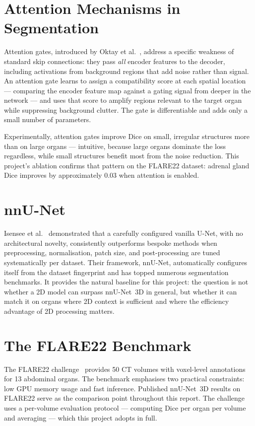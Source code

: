 \section{Attention Mechanisms in Segmentation}

Attention gates, introduced by Oktay et al.~\cite{oktay2018}, address a specific weakness of standard skip connections: they pass \emph{all} encoder features to the decoder, including activations from background regions that add noise rather than signal. An attention gate learns to assign a compatibility score at each spatial location --- comparing the encoder feature map against a gating signal from deeper in the network --- and uses that score to amplify regions relevant to the target organ while suppressing background clutter. The gate is differentiable and adds only a small number of parameters.

Experimentally, attention gates improve Dice on small, irregular structures more than on large organs --- intuitive, because large organs dominate the loss regardless, while small structures benefit most from the noise reduction. This project's ablation confirms that pattern on the FLARE22 dataset: adrenal gland Dice improves by approximately 0.03 when attention is enabled.

\section{nnU-Net}

Isensee et al.~\cite{isensee2021} demonstrated that a carefully configured vanilla U-Net, with no architectural novelty, consistently outperforms bespoke methods when preprocessing, normalisation, patch size, and post-processing are tuned systematically per dataset. Their framework, nnU-Net, automatically configures itself from the dataset fingerprint and has topped numerous segmentation benchmarks. It provides the natural baseline for this project: the question is not whether a 2D model can surpass nnU-Net~3D in general, but whether it can match it on organs where 2D context is sufficient and where the efficiency advantage of 2D processing matters.

\section{The FLARE22 Benchmark}

The FLARE22 challenge~\cite{flare22} provides 50 CT volumes with voxel-level annotations for 13 abdominal organs. The benchmark emphasises two practical constraints: low GPU memory usage and fast inference. Published nnU-Net~3D results on FLARE22 serve as the comparison point throughout this report. The challenge uses a per-volume evaluation protocol --- computing Dice per organ per volume and averaging --- which this project adopts in full.


